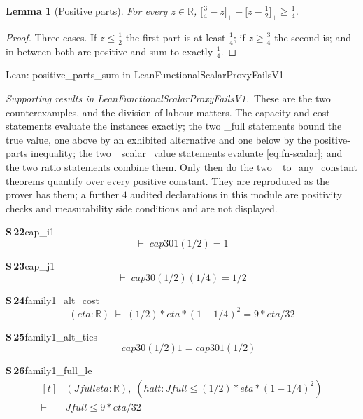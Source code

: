 \documentclass[conference]{IEEEtran}
\newtheorem{lemma}[theorem]{Lemma}
\theoremstyle{definition}
\newcommand{\lean}[1]{\textsf{\footnotesize #1}}
\newcommand{\leanbox}[1]{%
  \par\vspace{2pt}\noindent
  {\footnotesize\textsf{Lean: #1}}\par\vspace{2pt}}
\begin{document}
\begin{lemma}[Positive parts]
\label{lem:fn-posparts}
For every $z\in\mathbb{R}$,
$\bigl[\tfrac34-z\bigr]_{+}+\bigl[z-\tfrac12\bigr]_{+}\ge\tfrac14$.
\end{lemma}

\begin{proof}
Three cases. If $z\le\tfrac12$ the first part is at least $\tfrac14$; if $z\ge\tfrac34$ the
second is; and in between both are positive and sum to exactly $\tfrac14$.
\end{proof}

\leanbox{\lean{positive\_parts\_sum} in \lean{LeanFunctionalScalarProxyFailsV1}}

\noindent\emph{Supporting results in \lean{LeanFunctionalScalarProxyFailsV1}.}~These are the two counterexamples, and the division of labour matters. The capacity and cost statements evaluate the instances exactly; the two \lean{\_full} statements bound the true value, one above by an exhibited alternative and one below by the positive-parts inequality; the two \lean{\_scalar\_value} statements evaluate \eqref{eq:fn-scalar}; and the two ratio statements combine them. Only then do the two \lean{\_to\_any\_constant} theorems quantify over every positive constant. They are reproduced as the prover has them; a further $4$ audited declarations in this module are positivity checks and measurability side conditions and are not displayed.

\noindent\textbf{S\,22}\quad\lean{cap\_i1}
{\footnotesize\[ \vdash\; \mathit{cap3} 0 1 (1/2) = 1 \]}

\noindent\textbf{S\,23}\quad\lean{cap\_j1}
{\footnotesize\[ \vdash\; \mathit{cap3} 0 (1/2) (1/4) = 1/2 \]}

\noindent\textbf{S\,24}\quad\lean{family1\_alt\_cost}
{\footnotesize\[ (\mathit{eta} : \mathbb{R} ) \;\vdash\; (1/2) * \mathit{eta} * (1 - 1/4) ^{2} = 9 * \mathit{eta} / 32 \]}

\noindent\textbf{S\,25}\quad\lean{family1\_alt\_ties}
{\footnotesize\[ \vdash\; \mathit{cap3} 0 (1/2) 1 = \mathit{cap3} 0 1 (1/2) \]}

\noindent\textbf{S\,26}\quad\lean{family1\_full\_le}
{\footnotesize\[ \begin{aligned}[t]
&(\mathit{Jfull} \mathit{eta} : \mathbb{R} ),\; (\mathit{halt} : \mathit{Jfull} \leq (1/2) * \mathit{eta} * (1 - 1/4) ^{2})\\
\vdash\;&\mathit{Jfull} \leq 9 * \mathit{eta} / 32
\end{aligned} \]}
\end{document}
